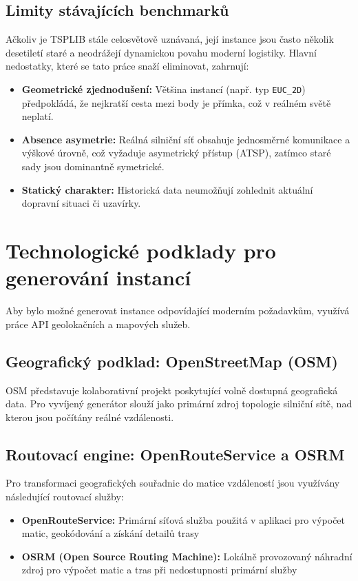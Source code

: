 \subsection{Limity stávajících benchmarků}
Ačkoliv je TSPLIB stále celosvětově uznávaná, její instance jsou často několik desetiletí staré a neodrážejí dynamickou povahu moderní logistiky. Hlavní nedostatky, které se tato práce snaží eliminovat, zahrnují:
\begin{itemize}
    \item \textbf{Geometrické zjednodušení:} Většina instancí (např. typ \texttt{EUC\_2D}) předpokládá, že nejkratší cesta mezi body je přímka, což v reálném světě neplatí.
    \item \textbf{Absence asymetrie:} Reálná silniční síť obsahuje jednosměrné komunikace a výškové úrovně, což vyžaduje asymetrický přístup (ATSP), zatímco staré sady jsou dominantně symetrické.
    \item \textbf{Statický charakter:} Historická data neumožňují zohlednit aktuální dopravní situaci či uzavírky.
\end{itemize}

\section{Technologické podklady pro generování instancí}
Aby bylo možné generovat instance odpovídající moderním požadavkům, využívá práce API geolokačních a mapových služeb.

\subsection{Geografický podklad: OpenStreetMap (OSM)}
OSM představuje kolaborativní projekt poskytující volně dostupná geografická data. Pro vyvíjený generátor slouží jako primární zdroj topologie silniční sítě, nad kterou jsou počítány reálné vzdálenosti.

\subsection{Routovací engine: OpenRouteService a OSRM}
Pro transformaci geografických souřadnic do matice vzdáleností jsou využívány následující routovací služby:
\begin{itemize}
    \item \textbf{OpenRouteService:} Primární síťová služba použitá v aplikaci pro výpočet matic, geokódování a získání detailů trasy
    \item \textbf{OSRM (Open Source Routing Machine):} Lokálně provozovaný náhradní zdroj pro výpočet matic a tras při nedostupnosti primární služby
\end{itemize}

